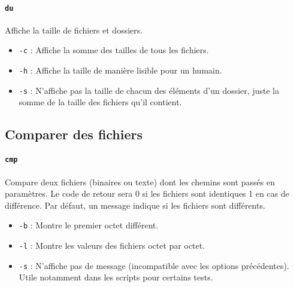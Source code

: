 \paragraph{\texttt{du}} 
Affiche la taille de fichiers et dossiers.
\begin{itemize}
    \item \texttt{-c} : Affiche la somme des tailles de tous les fichiers.
    \item \texttt{-h} : Affiche la taille de manière lisible pour un humain.
    \item \texttt{-s} : N'affiche pas la taille de chacun des éléments d'un dossier, juste la somme de la taille des fichiers qu'il contient.
\end{itemize}

\subsection{Comparer des fichiers}

\paragraph{\texttt{cmp}} 
Compare deux fichiers (binaires ou texte) dont les chemins sont passés en paramètres. Le code de retour sera 0 si les fichiers sont identiques 1 en cas de différence. Par défaut, un message indique si les fichiers sont différents.
\begin{itemize}
    \item \texttt{-b} : Montre le premier octet différent.
    \item \texttt{-l} : Montre les valeurs des fichiers octet par octet.
    \item \texttt{-s} : N'affiche pas de message (incompatible avec les options précédentes). Utile notamment dans les scripts pour certains tests.
\end{itemize}

